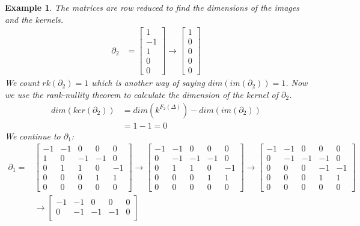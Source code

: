 \documentclass[11pt,a4paper,twoside]{report}
\newtheorem{myex}[mythm]{Example}
\begin{document}
\begin{myex}
The matrices are row reduced to find the dimensions of the images and the kernels.
\begin{align*}
\partial_2&= 
\begin{bmatrix}
1\\
-1\\
1\\
0\\
0
\end{bmatrix}
\to
\begin{bmatrix}
1\\
0\\
0\\
0\\
0
\end{bmatrix}
\end{align*}
We count $rk(\partial_2)=1$ which is another way of saying $dim(im(\partial_2))=1$. Now we use the rank-nullity theorem to calculate the dimension of the kernel of $\partial_2$.
\begin{align*}
dim(ker(\partial_2))&=dim(k^{F_2(\Delta)})-dim(im(\partial_2))\\
&=1-1= 0
\end{align*}
We continue to $\partial_1$:
\begin{align*}
\partial_1=&
\begin{bmatrix}
-1 & -1 & 0 & 0 & 0\\
1 & 0 & -1 & -1 & 0\\
0 & 1 & 1 & 0 & -1\\
0 & 0 & 0 & 1 & 1\\
0 & 0 & 0 & 0 & 0
\end{bmatrix}
\to
\begin{bmatrix}
-1 & -1 & 0 & 0 & 0\\
0 & -1 & -1 & -1 & 0\\
0 & 1 & 1 & 0 & -1\\
0 & 0 & 0 & 1 & 1\\
0 & 0 & 0 & 0 & 0
\end{bmatrix}
\to
\begin{bmatrix}
-1 & -1 & 0 & 0 & 0\\
0 & -1 & -1 & -1 & 0\\
0 & 0 & 0 & -1 & -1\\
0 & 0 & 0 & 1 & 1\\
0 & 0 & 0 & 0 & 0
\end{bmatrix}\\
&\to
\begin{bmatrix}
-1 & -1 & 0 & 0 & 0\\
0 & -1 & -1 & -1 & 0\\

\end{bmatrix}
\end{align*}
\end{myex}
\end{document}
